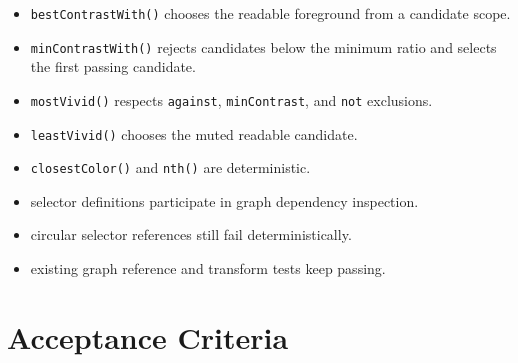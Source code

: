 \begin{itemize}
\tightlist
\item
  \texttt{b\allowbreak{}e\allowbreak{}s\allowbreak{}t\allowbreak{}C\allowbreak{}o\allowbreak{}n\allowbreak{}t\allowbreak{}r\allowbreak{}a\allowbreak{}s\allowbreak{}t\allowbreak{}W\allowbreak{}i\allowbreak{}t\allowbreak{}h\allowbreak{}(\allowbreak{})} chooses the readable foreground from a candidate scope.
\item
  \texttt{m\allowbreak{}i\allowbreak{}n\allowbreak{}C\allowbreak{}o\allowbreak{}n\allowbreak{}t\allowbreak{}r\allowbreak{}a\allowbreak{}s\allowbreak{}t\allowbreak{}W\allowbreak{}i\allowbreak{}t\allowbreak{}h\allowbreak{}(\allowbreak{})} rejects candidates below the minimum ratio and selects the first passing candidate.
\item
  \texttt{m\allowbreak{}o\allowbreak{}s\allowbreak{}t\allowbreak{}V\allowbreak{}i\allowbreak{}v\allowbreak{}i\allowbreak{}d\allowbreak{}(\allowbreak{})} respects \texttt{a\allowbreak{}g\allowbreak{}a\allowbreak{}i\allowbreak{}n\allowbreak{}s\allowbreak{}t}, \texttt{m\allowbreak{}i\allowbreak{}n\allowbreak{}C\allowbreak{}o\allowbreak{}n\allowbreak{}t\allowbreak{}r\allowbreak{}a\allowbreak{}s\allowbreak{}t}, and \texttt{n\allowbreak{}o\allowbreak{}t} exclusions.
\item
  \texttt{l\allowbreak{}e\allowbreak{}a\allowbreak{}s\allowbreak{}t\allowbreak{}V\allowbreak{}i\allowbreak{}v\allowbreak{}i\allowbreak{}d\allowbreak{}(\allowbreak{})} chooses the muted readable candidate.
\item
  \texttt{c\allowbreak{}l\allowbreak{}o\allowbreak{}s\allowbreak{}e\allowbreak{}s\allowbreak{}t\allowbreak{}C\allowbreak{}o\allowbreak{}l\allowbreak{}o\allowbreak{}r\allowbreak{}(\allowbreak{})} and \texttt{n\allowbreak{}t\allowbreak{}h\allowbreak{}(\allowbreak{})} are deterministic.
\item
  selector definitions participate in graph dependency inspection.
\item
  circular selector references still fail deterministically.
\item
  existing graph reference and transform tests keep passing.
\end{itemize}

\section{Acceptance Criteria}\label{record-184-acceptance-criteria}

